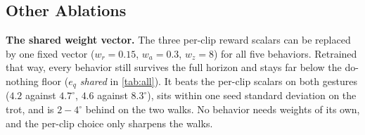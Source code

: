 \documentclass[letterpaper, 10 pt, conference]{ieeeconf}
\newcommand{\draft}[1]{}
\newcommand{\aref}[1]{~\hyperref[#1]{App.~\ref*{#1}}}
\newcommand{\aref}[1]{}
\begin{document}
\subsection{Other Ablations}\label{subsec:exp-abl}
\noindent
\textbf{The shared weight vector.} The three per-clip reward scalars can be replaced by one fixed vector ($w_r{=}0.15$, $w_a{=}0.3$, $w_z{=}8$) for all five behaviors. Retrained that way, every behavior still survives the full horizon and stays far below the do-nothing floor (\textit{$e_q$ shared} in \autoref{tab:all}). It beats the per-clip scalars on both gestures ($4.2$ against $4.7^\circ$, $4.6$ against $8.3^\circ$), sits within one seed standard deviation on the trot, and is $2-4^\circ$ behind on the two walks. No behavior needs weights of its own, and the per-clip choice only sharpens the walks.



\draft{
\textbf{Camera roll} is the input assumption the pipeline tolerates least. 
On the dog walk clip, rotating the 2D keypoints in-plane and re-running the fixed pipeline end to end with no finetuning involved, drifts the reference by roughly $1.3^\circ$ of joint error per degree of roll, smoothly up to $20^\circ$, before IK branch flips break the reference at $30^\circ$. The drift is smooth but not small, since a $10^\circ$ roll already displaces the reference by $13.3^\circ$, more than the $10.0^\circ$ that separates our video reference from MoCap (\autoref{subsec:exp-mocap}). We do not correct for roll, so clips must be close to level\aref{app:retarget}.
}
\end{document}
